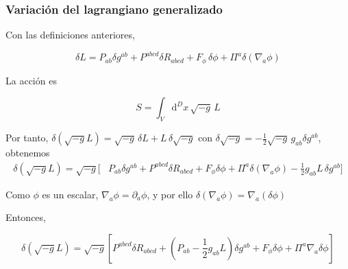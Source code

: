 \documentclass{beamer}
\renewcommand{\dd}{\mathrm{d}}
\begin{document}

\begin{frame}[label=nav-frame-074]
\frametitle{Variación del lagrangiano generalizado}
\footnotesize

Con las definiciones anteriores,

\begin{equation}
\boxed{
\delta L
=
P_{ab}\delta g^{ab}
+
P^{abcd}\delta R_{abcd}
+
F_\phi\,\delta\phi
+
\Pi^a\delta(\nabla_a\phi)
}
\label{eq:variacion-L-generalizado}
\end{equation}

La acción es

\[
S = \int_V \dd^Dx\,\sqrt{-g}\,L
\]

Por tanto, $\delta(\sqrt{-g}L) = \sqrt{-g}\,\delta L + L\,\delta\sqrt{-g}$ con $\delta\sqrt{-g} = -\frac12\sqrt{-g}\,g_{ab}\delta g^{ab}$, obtenemos
\[
\begin{aligned}
\delta(\sqrt{-g}L)
=
\sqrt{-g}\Big[
&P_{ab}\delta g^{ab}
+P^{abcd}\delta R_{abcd}
+F_\phi\delta\phi
+\Pi^a\delta(\nabla_a\phi) -\frac12g_{ab}L\,\delta g^{ab}
\Big]
\end{aligned}
\]

Como \(\phi\) es un escalar, $\nabla_a\phi=\partial_a\phi$, y por ello $\boxed{\delta(\nabla_a\phi)=\nabla_a(\delta\phi)}$

Entonces,

\begin{equation}
\delta(\sqrt{-g}L)
=
\sqrt{-g}
\left[
P^{abcd}\delta R_{abcd}
+
\left(
P_{ab}-\frac12g_{ab}L
\right)\delta g^{ab}
+
F_\phi\delta\phi
+
\Pi^a\nabla_a\delta\phi
\right]
\label{eq:variacion-densidad-generalizada}
\end{equation}

\end{frame}
\end{document}
